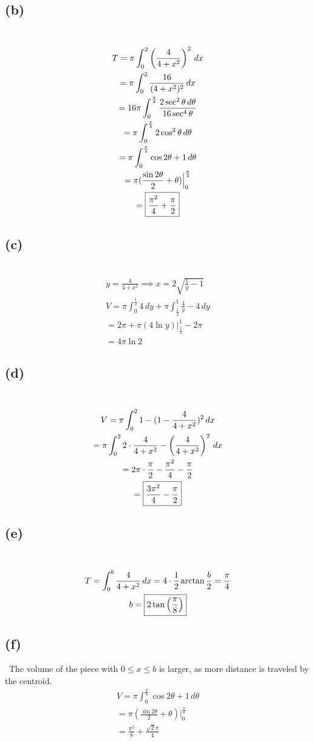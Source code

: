 \documentclass[12pt]{article}
\newcommand*{\paren}[1]{\ensuremath\left(#1\right)}
\newcommand{\subproblem}[1]{\subsection{(#1)} \,}
\begin{document}
\subproblem{b}
\begin{gather*}
    T=\pi \int_0^2\paren{\frac{4}{4+x^2}}^2 \, dx\\
    =\pi \int_0^2 \frac{16}{(4+x^2)^2}\,dx\\
    = 16\pi \int_0^\frac{\pi}{4} \frac{2\sec^2\theta\, d\theta }{16\sec^4 \theta }\\
    = \pi \int_0^\frac{\pi}{4} 2\cos^2 \theta \,d\theta \\
    =\pi \int_0^\frac{\pi}{4} \cos 2\theta +1\,d\theta\\
    = \pi (\frac{\sin 2\theta}{2}+\theta )\Big|_0^\frac{\pi}{4}\\
    = \boxed{\frac{\pi^2}{4}+\frac{\pi}{2}}
\end{gather*}

\subproblem{c}
\begin{gather*}
    y=\frac{4}{4+x^2} \implies x=2\sqrt{\frac{1}{y}-1}\\
    V=\pi \int_0^\frac{1}{2}4\, dy+\pi \int_{\frac{1}{2}}^1 \frac{4}{y}-4\, dy\\
    =2\pi + \pi (4\ln y )\Big|^1_\frac{1}{2}-2\pi\\
    =\boxed{4\pi \ln 2}
\end{gather*}

\subproblem{d}
\begin{gather*}
    V=\pi \int_0^21-(1-\frac{4}{4+x^2})^2\, dx\\
    =\pi \int_0^2 2\cdot \frac{4}{4+x^2} - \paren{\frac{4}{4+x^2}}^2\, dx\\
    = 2\pi \cdot  \frac{\pi}{2} - \frac{\pi^2}{4}-\frac{\pi}{2}\\
    = \boxed{\frac{3\pi^2}{4}-\frac{\pi}{2}}
\end{gather*}

\subproblem{e}
\begin{gather*}
    T=\int_0^b\frac{4}{4+x^2} \, dx = 4\cdot \frac{1}{2} \arctan \frac{b}{2} = \frac{\pi}{4}\\
    b=\boxed{2 \tan \paren{\frac{\pi}{8}}}
\end{gather*}

\subproblem{f}
The volume of the piece with $0\le x\le b$ is larger, as more distance is traveled by the centroid. 
\begin{gather*}
    V= \pi \int_0^\frac{\pi}{8}\cos 2\theta +1\,d\theta\\
    = \pi (\frac{\sin 2\theta}{2}+\theta )\Big|_0^\frac{\pi}{8}\\
    = \boxed{\frac{\pi^2}{8} + \frac{\sqrt{2}\pi}{4}}
\end{gather*}
\end{document}
